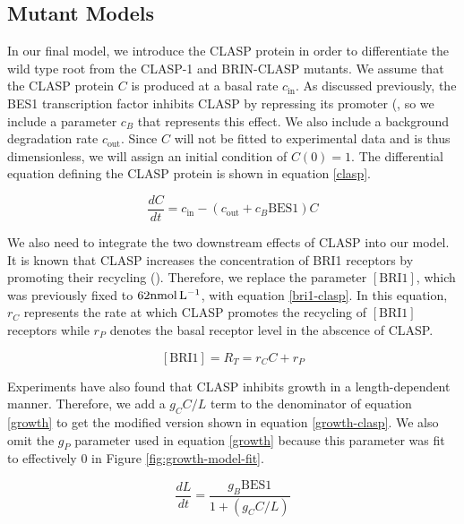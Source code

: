 \subsection{Mutant Models}

In our final model, we introduce the CLASP protein in order to differentiate the wild type root from the CLASP-1 and BRIN-CLASP mutants. We assume that the CLASP protein $C$ is produced at a basal rate $c_{\text{in}}$. As discussed previously, the BES1 transcription factor inhibits CLASP by repressing its promoter (\cite{ruan2018}, so we include a parameter $c_{B}$ that represents this effect. We also include a background degradation rate $c_{\text{out}}$. Since $C$ will not be fitted to experimental data and is thus dimensionless, we will assign an initial condition of $C(0) = 1$. The differential equation defining the CLASP protein is shown in equation \eqref{clasp}.

\begin{equation}
\label{clasp}
\frac{dC}{dt} = c_{\text{in}} - (c_{\text{out}} + c_{B}\text{BES1})C
\end{equation}

We also need to integrate the two downstream effects of CLASP into our model. It is known that CLASP increases the concentration of BRI1 receptors by promoting their recycling (\cite{ruan2018}). Therefore, we replace the parameter $[\text{BRI1}]$, which was previously fixed to $62\nm$, with equation \eqref{bri1-clasp}. In this equation, $r_{C}$ represents the rate at which CLASP promotes the recycling of $[\text{BRI1}]$ receptors while $r_{P}$ denotes the basal receptor level in the abscence of CLASP.

\begin{equation}
\label{bri1-clasp}
[\text{BRI1}] = R_{T} = r_{C}C + r_{P}
\end{equation}

Experiments have also found that CLASP inhibits growth in a length-dependent manner. Therefore, we add a $g_{C}C / L$ term to the denominator of  equation \eqref{growth} to get the modified version shown in equation \eqref{growth-clasp}. We also omit the $g_{P}$ parameter used in equation \eqref{growth} because this parameter was fit to effectively $0$ in Figure \ref{fig:growth-model-fit}.

\begin{equation}
\label{growth-clasp}
\frac{dL}{dt} = \frac{g_{B}\text{BES1}}{1 + (g_{C}C/L)}
\end{equation}


